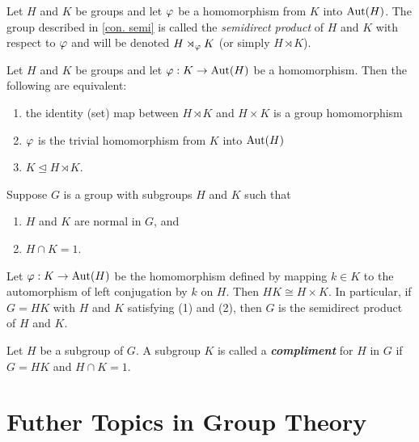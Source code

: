 \begin{defn}
Let $H$ and $K$ be groups and let $\varphi$ be a homomorphism from $K$ into $\text{Aut}(H)$. The group described in \autoref{con. semi} is called the \textit{semidirect product} of $H$ and $K$ with respect to $\varphi$ and will be denoted $H\rtimes_\varphi K$ (or simply $H\rtimes K$).
\end{defn}

\nl

\begin{prop}
Let $H$ and $K$ be groups and let $\varphi:K\rightarrow \text{Aut}(H)$ be a homomorphism. Then the following are equivalent:
\begin{enumerate}
\item the identity (set) map between $H\rtimes K$ and $H\times K$ is a group homomorphism
\item $\varphi$ is the trivial homomorphism from $K$ into $\text{Aut}(H)$
\item $K\unlhd H\rtimes K$.
\end{enumerate}
\end{prop}

\nl

\begin{thm}
Suppose $G$ is a group with subgroups $H$ and $K$ such that
\begin{enumerate}
\item $H$ and $K$ are normal in $G$, and
\item $H\cap K = 1$.
\end{enumerate}
Let $\varphi:K\rightarrow \text{Aut}(H)$ be the homomorphism defined by mapping $k\in K$ to the automorphism of left conjugation by $k$ on $H$. Then $HK\cong H\times K$. In particular, if $G=HK$ with $H$ and $K$ satisfying (1) and (2), then $G$ is the semidirect product of $H$ and $K$.
\end{thm}

\nl

\begin{defn}
Let $H$ be a subgroup of $G$. A subgroup $K$ is called a \textbf{\textit{compliment}} for $H$ in $G$ if $G = HK$ and $H\cap K = 1$.
\end{defn}


\section{Futher Topics in Group Theory}
\setcounter{thm}{0}

